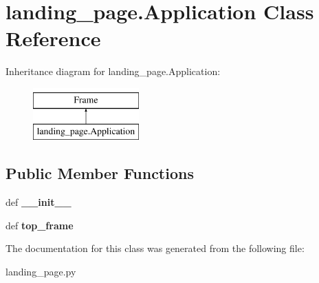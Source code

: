 \hypertarget{classlanding__page_1_1Application}{\section{landing\-\_\-page.\-Application Class Reference}
\label{classlanding__page_1_1Application}
}
Inheritance diagram for landing\-\_\-page.\-Application\-:\begin{figure}[H]
\begin{center}
\leavevmode
\includegraphics[height=2.000000cm]{classlanding__page_1_1Application}
\end{center}
\end{figure}
\subsection*{Public Member Functions}
\begin{DoxyCompactItemize}
\item 
\hypertarget{classlanding__page_1_1Application_a6fd1e9f36977b842206dc24d31248d33}{def {\bfseries \-\_\-\-\_\-init\-\_\-\-\_\-}}\label{classlanding__page_1_1Application_a6fd1e9f36977b842206dc24d31248d33}

\item 
\hypertarget{classlanding__page_1_1Application_aa3b295c121b52349053e5c0bd8d2c407}{def {\bfseries top\-\_\-frame}}\label{classlanding__page_1_1Application_aa3b295c121b52349053e5c0bd8d2c407}

\end{DoxyCompactItemize}


The documentation for this class was generated from the following file\-:\begin{DoxyCompactItemize}
\item 
landing\-\_\-page.\-py\end{DoxyCompactItemize}
